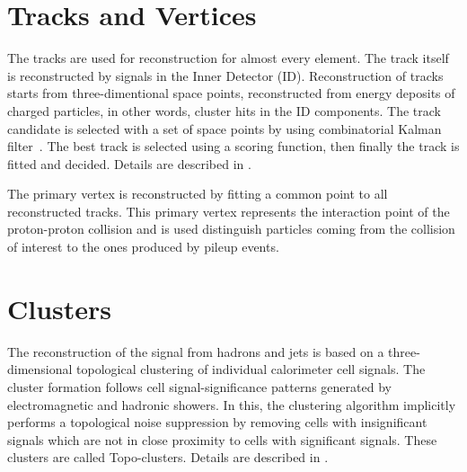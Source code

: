 \section{Tracks and Vertices}
The tracks are used for reconstruction for almost every element.
The track itself is reconstructed by signals in the Inner Detector (ID).
Reconstruction of tracks starts from three-dimentional space points, reconstructed from energy deposits of charged particles, in other words, cluster hits in the ID components. 
The track candidate is selected with a set of space points by using combinatorial Kalman filter~\cite{FRUHWIRTH1987444}. 
The best track is selected using a scoring function, then finally the track is fitted and decided. Details are described in \cite{PERF-2015-08}.

The primary vertex is reconstructed by fitting a common point to all reconstructed tracks. This primary vertex represents the interaction point of the proton-proton collision and is used distinguish particles coming from the collision of interest to the ones produced by pileup events.

\section{Clusters} %
The reconstruction of the signal from hadrons and jets is based on a three-dimensional topological clustering of individual calorimeter cell signals.
The cluster formation follows cell signal-significance patterns generated by electromagnetic and hadronic showers. In this, the clustering algorithm implicitly performs a topological noise suppression by removing cells with insignificant signals which are not in close proximity to cells with significant signals. These clusters are called Topo-clusters. Details are described in \cite{PERF-2014-07}.
